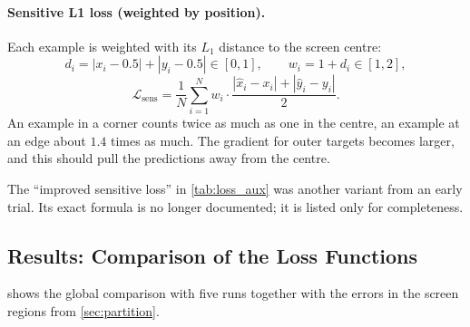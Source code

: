 \paragraph{Sensitive L1 loss (weighted by position).}
Each example is weighted with its $L_1$ distance to the screen centre:
\begin{equation}
  d_i = |x_i-0.5| + |y_i-0.5| \in [0,1],\qquad
  w_i = 1 + d_i \in [1,2],
\end{equation}
\begin{equation}
  \mathcal{L}_{\mathrm{sens}} = \frac{1}{N}\sum_{i=1}^{N}
  w_i\cdot\frac{|\hat x_i-x_i| + |\hat y_i-y_i|}{2}.
\end{equation}
An example in a corner counts twice as much as one in the centre, an example at
an edge about $1.4$ times as much. The gradient for outer targets becomes
larger, and this should pull the predictions away from the centre.

The \enquote{improved sensitive loss} in \cref{tab:loss_aux} was another
variant from an early trial. Its exact formula is no longer documented; it is
listed only for completeness.

\subsection{Results: Comparison of the Loss Functions}
\label{sec:loss_results}

 shows the global comparison with five runs together with the
errors in the screen regions from \cref{sec:partition}.

